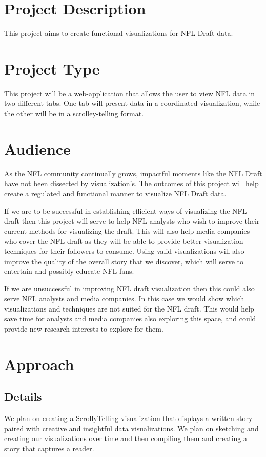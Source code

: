 \documentclass{proc}
\begin{document}
\section{Project Description}
This project aims to create functional visualizations for NFL Draft data. 
\section{Project Type}
This project will be a web-application that allows the user to view NFL data in two different tabs. One tab will present data in a coordinated visualization, while the other will be in a scrolley-telling format. 
\section{Audience} 
As the NFL community continually grows, impactful moments like the NFL Draft have not been dissected by visualization's. The outcomes of this project will help create a regulated and functional manner to visualize NFL Draft data. 

If we are to be successful in establishing efficient ways of visualizing the NFL draft then this project will serve to help NFL analysts who wish to improve their current methods for visualizing the draft. This will also help media companies who cover the NFL draft as they will be able to provide better visualization techniques for their followers to consume. Using valid visualizations will also improve the quality of the overall story that we discover, which will serve to entertain and possibly educate NFL fans. 

If we are unsuccessful in improving NFL draft visualization then this could also serve NFL analysts and media companies. In this case we would show which visualizations and techniques are not suited for the NFL draft. This would help save time for analysts and media companies also exploring this space, and could provide new research interests to explore for them.

\section{Approach}
\subsection{Details}
We plan on creating a ScrollyTelling visualization that displays a written story paired with creative and insightful data visualizations. We plan on sketching and creating our visualizations over time and then compiling them and creating a story that captures a reader.
\end{document}
